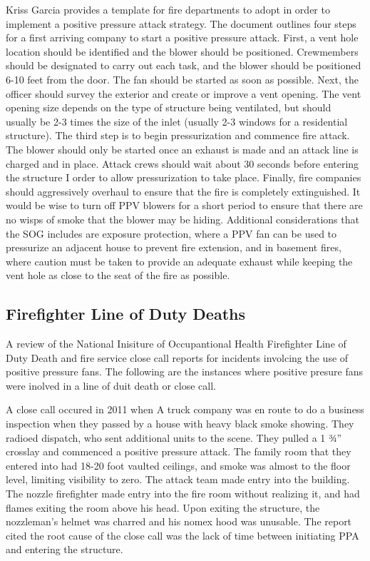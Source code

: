 \documentclass{article}
\begin{document}
Kriss Garcia provides a template for fire departments to adopt in order to implement a positive pressure attack strategy. The document outlines four steps for a first arriving company to start a positive pressure attack. First, a vent hole location should be identified and the blower should be positioned. Crewmembers should be designated to carry out each task, and the blower should be positioned 6-10 feet from the door. The fan should be started as soon as possible. Next, the officer should survey the exterior and create or improve a vent opening. The vent opening size depends on the type of structure being ventilated, but should usually be 2-3 times the size of the inlet (usually 2-3 windows for a residential structure).  The third step is to begin pressurization and commence fire attack. The blower should only be started once an exhaust is made and an attack line is charged and in place. Attack crews should wait about 30 seconds before entering the structure I order to allow pressurization to take place. Finally, fire companies should aggressively overhaul to ensure that the fire is completely extinguished. It would be wise to turn off PPV blowers for a short period to ensure that there are no wisps of smoke that the blower may be hiding. Additional considerations that the SOG includes are exposure protection, where a PPV fan can be used to pressurize an adjacent house to prevent fire extension, and in basement fires, where caution must be taken to provide an adequate exhaust while keeping the vent hole as close to the seat of the fire as possible.\cite{SuggestedSOP}

\subsection{Firefighter Line of Duty Deaths}
A review of the National Inisiture of Occupantional Health Firefighter Line of Duty Death and fire service close call reports for incidents involcing the use of positive pressure fans. The following are the instances where positive presure fans were inolved in a line of duit death or close call. 

A close call occured in 2011 when A truck company was en route to do a business inspection when they passed by a house with heavy black smoke showing. They radioed dispatch, who sent additional units to the scene. They pulled a 1 ¾” crosslay and commenced a positive pressure attack. The family room that they entered into had 18-20 foot vaulted ceilings, and smoke was almost to the floor level, limiting visibility to zero. The attack team made entry into the building. The nozzle firefighter made entry into the fire room without realizing it, and had flames exiting the room above his head. Upon exiting the structure, the nozzleman’s helmet was charred and his nomex hood was unusable. The report cited the root cause of the close call was the lack of time between initiating PPA and entering the structure.\cite{VaultedCeilingsFFCC}
\end{document}
